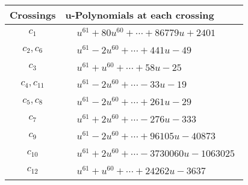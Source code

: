 \documentclass[1p]{elsarticle_modified}
\theoremstyle{definition}
\begin{document}
\begin{tabular}{m{50pt}|m{274pt}}
Crossings & \hspace{64pt}u-Polynomials at each crossing \\
\hline $$\begin{aligned}c_{1}\end{aligned}$$&$\begin{aligned}
&u^{61}+80 u^{60}+\cdots+86779 u+2401
\end{aligned}$\\
\hline $$\begin{aligned}c_{2},c_{6}\end{aligned}$$&$\begin{aligned}
&u^{61}-2 u^{60}+\cdots+441 u-49
\end{aligned}$\\
\hline $$\begin{aligned}c_{3}\end{aligned}$$&$\begin{aligned}
&u^{61}+u^{60}+\cdots+58 u-25
\end{aligned}$\\
\hline $$\begin{aligned}c_{4},c_{11}\end{aligned}$$&$\begin{aligned}
&u^{61}-2 u^{60}+\cdots-33 u-19
\end{aligned}$\\
\hline $$\begin{aligned}c_{5},c_{8}\end{aligned}$$&$\begin{aligned}
&u^{61}-2 u^{60}+\cdots+261 u-29
\end{aligned}$\\
\hline $$\begin{aligned}c_{7}\end{aligned}$$&$\begin{aligned}
&u^{61}+2 u^{60}+\cdots-276 u-333
\end{aligned}$\\
\hline $$\begin{aligned}c_{9}\end{aligned}$$&$\begin{aligned}
&u^{61}-2 u^{60}+\cdots+96105 u-40873
\end{aligned}$\\
\hline $$\begin{aligned}c_{10}\end{aligned}$$&$\begin{aligned}
&u^{61}+2 u^{60}+\cdots-3730060 u-1063025
\end{aligned}$\\
\hline $$\begin{aligned}c_{12}\end{aligned}$$&$\begin{aligned}
&u^{61}+u^{60}+\cdots+24262 u-3637
\end{aligned}$\\
\hline
\end{tabular}\\~\\
\end{document}
